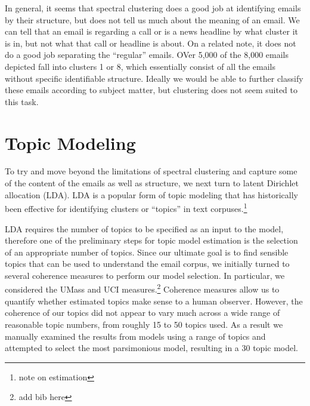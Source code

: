 \documentclass[12pt]{article}
\theoremstyle{definition}
\theoremstyle{algodesc}
\begin{document}
In general, it seems that spectral clustering does a good job at identifying emails by their structure, but does not tell us much about the meaning of an email. We can tell that an email is regarding a call or is a news headline by what cluster it is in, but not what that call or headline is about. On a related note, it does not do a good job separating the ``regular'' emails. OVer 5,000 of the 8,000 emails depicted fall into clusters 1 or 8, which essentially consist of all the emails without specific identifiable structure. Ideally we would be able to further classify these emails according to subject matter, but clustering does not seem suited to this task.


\section{Topic Modeling}

To try and move beyond the limitations of spectral clustering and capture some of the content of the emails as well as structure, we next turn to latent Dirichlet allocation (LDA). LDA is a popular form of topic modeling that has historically been effective for identifying clusters or ``topics'' in text corpuses.\footnote{note on estimation}

LDA requires the number of topics to be specified as an input to the model, therefore one of the preliminary steps for topic model estimation is the selection of an appropriate number of topics. Since our ultimate goal is to find sensible topics that can be used to understand the email corpus, we initially turned to several coherence measures to perform our model selection. In particular, we considered the UMass and UCI measures.\footnote{add bib here} Coherence measures allow us to quantify whether estimated topics make sense to a human observer. However, the coherence of our topics did not appear to vary much across a wide range of reasonable topic numbers, from roughly 15 to 50 topics used. As a result we manually examined the results from models using a range of topics and attempted to select the most parsimonious model, resulting in a 30 topic model.

\end{document}
